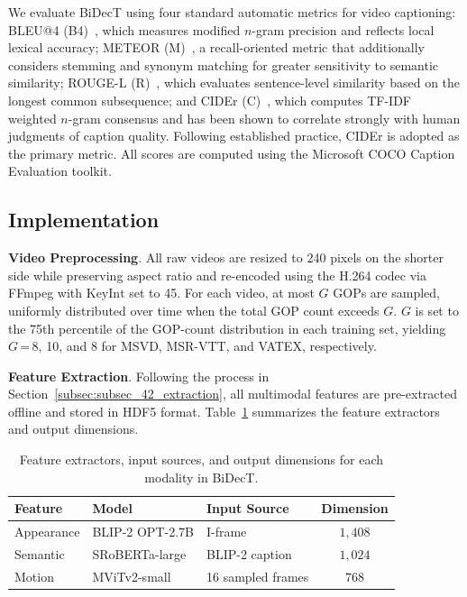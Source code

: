 
We evaluate BiDecT using four standard automatic metrics for video captioning: BLEU@4 (B4)~\cite{papineniBleuMethodAutomatic2002}, which measures modified $n$-gram precision and reflects local lexical accuracy; METEOR (M)~\cite{banerjeeMETEORAutomaticMetric2005}, a recall-oriented metric that additionally considers stemming and synonym matching for greater sensitivity to semantic similarity; ROUGE-L (R)~\cite{linAutomaticEvaluationMachine2004}, which evaluates sentence-level similarity based on the longest common subsequence; and CIDEr (C)~\cite{vedantamCIDErConsensusbasedImage2015}, which computes TF-IDF weighted $n$-gram consensus and has been shown to correlate strongly with human judgments of caption quality. Following established practice, CIDEr is adopted as the primary metric. All scores are computed using the Microsoft COCO Caption Evaluation toolkit.


\subsection{Implementation}
\label{subsec:subsec_53_implement}
\textbf{Video Preprocessing}. All raw videos are resized to 240 pixels on the shorter side while preserving aspect ratio and re-encoded using the H.264 codec via FFmpeg with $\mathrm{KeyInt}$ set to 45. For each video, at most $G$ GOPs are sampled, uniformly distributed over time when the total GOP count exceeds $G$. $G$ is set to the 75th percentile of the GOP-count distribution in each training set, yielding $G\,\texttt{=}\,$8, 10, and 8 for MSVD, MSR-VTT, and VATEX, respectively.

\textbf{Feature Extraction}. Following the process in Section~\ref{subsec:subsec_42_extraction}, all multimodal features are pre-extracted offline and stored in HDF5 format. Table~\ref{tab:tab02_feature_extractors} summarizes the feature extractors and output dimensions.

\begin{table}[!t]
\caption{Feature extractors, input sources, and output dimensions for each modality in BiDecT.}
\label{tab:tab02_feature_extractors}
\centering
\begin{tabular}{l l l c}
\hline\hline
\textbf{Feature} & \textbf{Model} & \textbf{Input Source} & \textbf{Dimension} \\
\hline
Appearance & BLIP-2 OPT-2.7B & I-frame & $1{,}408$ \\
Semantic & SRoBERTa-large & BLIP-2 caption & $1{,}024$ \\
Motion & MViTv2-small & 16 sampled frames & $768$ \\
\hline\hline
\end{tabular}
\end{table}

